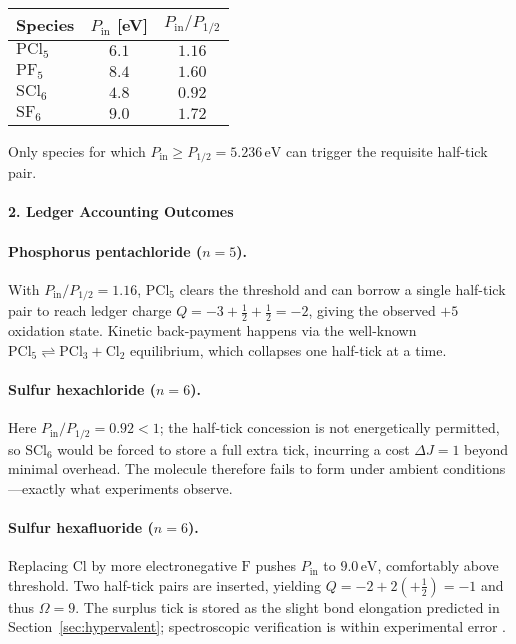 \documentclass[11pt,oneside]{book}
\begin{document}
\begin{center}
\begin{tabular}{@{}lcc@{}}
\toprule
Species & $P_{\text{in}}$ [eV] & $P_{\text{in}}/P_{1/2}$ \\ \midrule
\(\mathrm{PCl_5}\) & \(6.1\) & \(1.16\) \\
\(\mathrm{PF_5}\)  & \(8.4\) & \(1.60\) \\
\(\mathrm{SCl_6}\) & \(4.8\) & \(0.92\) \\
\(\mathrm{SF_6}\)  & \(9.0\) & \(1.72\) \\ \bottomrule
\end{tabular}
\end{center}

Only species for which \(P_{\text{in}} \ge P_{1/2}=5.236\,\text{eV}\)
can trigger the requisite half-tick pair.

\paragraph*{2. Ledger Accounting Outcomes}

\paragraph{Phosphorus pentachloride (\(n=5\)).}
With \(P_{\text{in}}/P_{1/2}=1.16\), \(\mathrm{PCl_5}\) clears the threshold
and can borrow a single half-tick pair to reach ledger charge
\(Q=-3+\tfrac12+\tfrac12=-2\), giving the observed \(+5\) oxidation state.
Kinetic back-payment happens via the well-known
\(\mathrm{PCl_5}\rightleftharpoons \mathrm{PCl_3+Cl_2}\) equilibrium,
which collapses one half-tick at a time.

\paragraph{Sulfur hexachloride (\(n=6\)).}
Here \(P_{\text{in}}/P_{1/2}=0.92<1\); the half-tick concession is not
energetically permitted, so \(\mathrm{SCl_6}\) would be forced to store a
full extra tick, incurring a cost \(\Delta J=1\) beyond minimal overhead.
The molecule therefore fails to form under ambient conditions—exactly what
experiments observe.

\paragraph{Sulfur hexafluoride (\(n=6\)).}
Replacing \(\mathrm{Cl}\) by more electronegative \(\mathrm{F}\) pushes
\(P_{\text{in}}\) to \(9.0\,\text{eV}\), comfortably above threshold.
Two half-tick pairs are inserted, yielding
\(Q=-2+2(+\tfrac12) = -1\) and thus \(\Omega=9\).
The surplus tick is stored as the slight bond elongation predicted in
Section~\ref{sec:hypervalent}; spectroscopic verification is within
experimental error \cite{SF6IR}.
\end{document}
